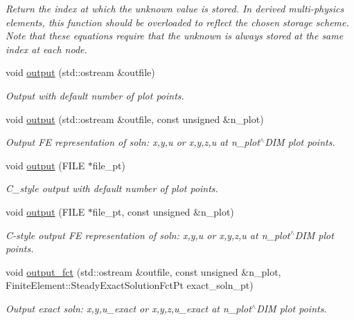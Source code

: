 \begin{DoxyCompactItemize}
\begin{DoxyCompactList}\small\item\em Return the index at which the unknown value is stored. In derived multi-\/physics elements, this function should be overloaded to reflect the chosen storage scheme. Note that these equations require that the unknown is always stored at the same index at each node. \end{DoxyCompactList}\item 
void \hyperlink{classoomph_1_1MyBiharmonicEquations_aa0d1248dcc8fcebd986c295d6af2ebf6}{output} (std\+::ostream \&outfile)
\begin{DoxyCompactList}\small\item\em Output with default number of plot points. \end{DoxyCompactList}\item 
void \hyperlink{classoomph_1_1MyBiharmonicEquations_a9a2734695e94f83eb6d553a7090dbebd}{output} (std\+::ostream \&outfile, const unsigned \&n\+\_\+plot)
\begin{DoxyCompactList}\small\item\em Output FE representation of soln\+: x,y,u or x,y,z,u at n\+\_\+plot$^\wedge$\+D\+IM plot points. \end{DoxyCompactList}\item 
void \hyperlink{classoomph_1_1MyBiharmonicEquations_a2ee8f210f50cf3b43f2b31b5e16b704f}{output} (F\+I\+LE $\ast$file\+\_\+pt)
\begin{DoxyCompactList}\small\item\em C\+\_\+style output with default number of plot points. \end{DoxyCompactList}\item 
void \hyperlink{classoomph_1_1MyBiharmonicEquations_a898e272a1af66eacb3ebe5ac2fbe7749}{output} (F\+I\+LE $\ast$file\+\_\+pt, const unsigned \&n\+\_\+plot)
\begin{DoxyCompactList}\small\item\em C-\/style output FE representation of soln\+: x,y,u or x,y,z,u at n\+\_\+plot$^\wedge$\+D\+IM plot points. \end{DoxyCompactList}\item 
void \hyperlink{classoomph_1_1MyBiharmonicEquations_a0f45f28eae4d25ddd9e53a769c3626a3}{output\+\_\+fct} (std\+::ostream \&outfile, const unsigned \&n\+\_\+plot, Finite\+Element\+::\+Steady\+Exact\+Solution\+Fct\+Pt exact\+\_\+soln\+\_\+pt)
\begin{DoxyCompactList}\small\item\em Output exact soln\+: x,y,u\+\_\+exact or x,y,z,u\+\_\+exact at n\+\_\+plot$^\wedge$\+D\+IM plot points. \end{DoxyCompactList}\item 

\end{DoxyCompactItemize}

